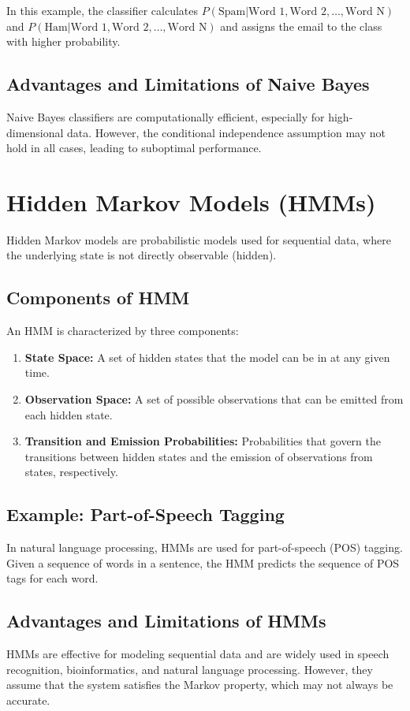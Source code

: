 \documentclass{article}
\begin{document}
In this example, the classifier calculates $P(\text{Spam}|\text{Word 1}, \text{Word 2}, \ldots, \text{Word N})$ and $P(\text{Ham}|\text{Word 1}, \text{Word 2}, \ldots, \text{Word N})$ and assigns the email to the class with higher probability.

\subsection{Advantages and Limitations of Naive Bayes}
Naive Bayes classifiers are computationally efficient, especially for high-dimensional data. However, the conditional independence assumption may not hold in all cases, leading to suboptimal performance.

\section{Hidden Markov Models (HMMs)}
Hidden Markov models are probabilistic models used for sequential data, where the underlying state is not directly observable (hidden).

\subsection{Components of HMM}
An HMM is characterized by three components:
\begin{enumerate}
    \item \textbf{State Space:} A set of hidden states that the model can be in at any given time.
    \item \textbf{Observation Space:} A set of possible observations that can be emitted from each hidden state.
    \item \textbf{Transition and Emission Probabilities:} Probabilities that govern the transitions between hidden states and the emission of observations from states, respectively.
\end{enumerate}

\subsection{Example: Part-of-Speech Tagging}
In natural language processing, HMMs are used for part-of-speech (POS) tagging. Given a sequence of words in a sentence, the HMM predicts the sequence of POS tags for each word.

\subsection{Advantages and Limitations of HMMs}
HMMs are effective for modeling sequential data and are widely used in speech recognition, bioinformatics, and natural language processing. However, they assume that the system satisfies the Markov property, which may not always be accurate.
\end{document}
